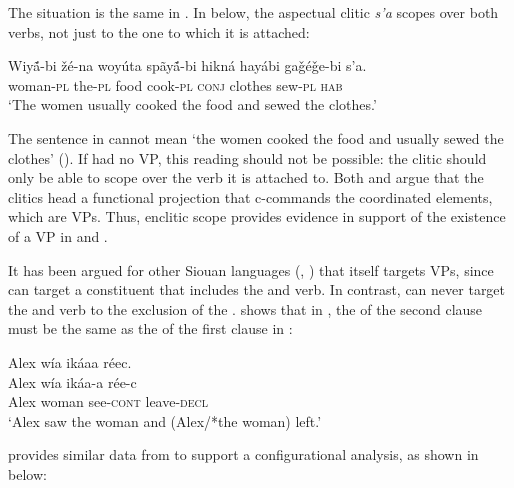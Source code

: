 \documentclass[output=paper]{LSP/langsci}
\begin{document}
The situation is the same in .  In  below, the aspectual clitic \textit{s'a} scopes over both verbs, not just to the one to which it is attached:

\begin{exe}
\ex\label{ex:jrs:28} \gll Wiy\'{\~a}-bi 		\v{z}\'e-na 	woy\'uta 	sp\~ay\'{\~a}-bi 	hikn\'a 	hay\'abi 		ga\v{g}\'e\v{g}e-bi 	s'a. \\
woman-\textsc{pl} the-\textsc{pl} 	food 	cook-\textsc{pl} \textsc{conj} 	clothes 	sew-\textsc{pl} 	\textsc{hab} \\
\trans `The women usually cooked the food and sewed the clothes.' \citep[39]{West2003}
\end{exe}

The sentence in  cannot mean `the women cooked the food and usually sewed the clothes' (\citealt{West2003}).  If  had no VP, this reading should not be possible: the clitic should only be able to scope over the verb it is attached to. Both \citet{Boyle2007} and \citet{West2003} argue that the clitics head a functional projection that c-commands the coordinated elements, which are VPs.  Thus, enclitic scope provides evidence in support of the existence of a VP in  and .
	
It has been argued for other Siouan languages (\citealt{Boyle2007}, \citealt{West2003}) that  itself targets VPs, since  can target a constituent that includes the  and verb. In contrast,  can never target the  and verb to the exclusion of the .  \citet{Boyle2007} shows that in , the  of the second clause must be the same as the  of the first clause in :

\begin{exe}
\ex\label{ex:jrs:29} 
\glll Alex w\'ia ik\'aaa r\'eec.\\
Alex w\'ia ik\'aa-a r\'ee-c \\
Alex woman see-\textsc{cont} leave-\textsc{decl} \\
\trans `Alex saw the woman and (Alex/*the woman) left.' \citep[217]{Boyle2007} 
\end{exe}

\citet{West2003} provides similar data from  to support a configurational analysis, as shown in  below:
\end{document}

